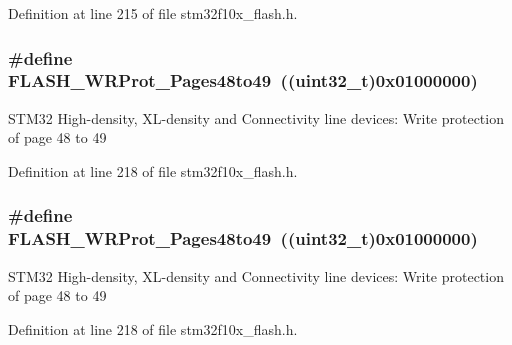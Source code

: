 Definition at line 215 of file stm32f10x\+\_\+flash.\+h.

\subsubsection[{\texorpdfstring{F\+L\+A\+S\+H\+\_\+\+W\+R\+Prot\+\_\+\+Pages48to49}{FLASH_WRProt_Pages48to49}}]{\setlength{\rightskip}{0pt plus 5cm}\#define F\+L\+A\+S\+H\+\_\+\+W\+R\+Prot\+\_\+\+Pages48to49~(({\bf uint32\+\_\+t})0x01000000)}\hypertarget{group___option___bytes___write___protection_ga12744383aa65b2eb38e37d41a12bb6fe}{}\label{group___option___bytes___write___protection_ga12744383aa65b2eb38e37d41a12bb6fe}
S\+T\+M32 High-\/density, X\+L-\/density and Connectivity line devices\+: Write protection of page 48 to 49 

Definition at line 218 of file stm32f10x\+\_\+flash.\+h.

\subsubsection[{\texorpdfstring{F\+L\+A\+S\+H\+\_\+\+W\+R\+Prot\+\_\+\+Pages48to49}{FLASH_WRProt_Pages48to49}}]{\setlength{\rightskip}{0pt plus 5cm}\#define F\+L\+A\+S\+H\+\_\+\+W\+R\+Prot\+\_\+\+Pages48to49~(({\bf uint32\+\_\+t})0x01000000)}\hypertarget{group___option___bytes___write___protection_ga12744383aa65b2eb38e37d41a12bb6fe}{}\label{group___option___bytes___write___protection_ga12744383aa65b2eb38e37d41a12bb6fe}
S\+T\+M32 High-\/density, X\+L-\/density and Connectivity line devices\+: Write protection of page 48 to 49 

Definition at line 218 of file stm32f10x\+\_\+flash.\+h.

